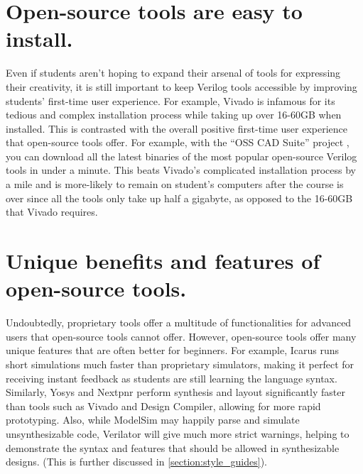 \section{Open-source tools are easy to install.}

Even if students aren't hoping to expand their arsenal of tools for expressing their creativity, it is still important to keep Verilog tools accessible by improving students' first-time user experience. For example, Vivado is infamous for its tedious and complex installation process while taking up over 16-60GB when installed. This is contrasted with the overall positive first-time user experience that open-source tools offer. For example, with the \enquote{OSS CAD Suite} project \cite{osscadsuitebuildGitHub}, you can download all the latest binaries of the most popular open-source Verilog tools in under a minute. This beats Vivado's complicated installation process by a mile and is more-likely to remain on student's computers after the course is over since all the tools only take up half a gigabyte, as opposed to the 16-60GB that Vivado requires.

\section{Unique benefits and features of open-source tools.}

Undoubtedly, proprietary tools offer a multitude of functionalities for advanced users that open-source tools cannot offer. However, open-source tools offer many unique features that are often better for beginners. For example, Icarus runs short simulations much faster than proprietary simulators, making it perfect for receiving instant feedback as students are still learning the language syntax. Similarly, Yosys and Nextpnr perform synthesis and layout significantly faster than tools such as Vivado and Design Compiler, allowing for more rapid prototyping. Also, while ModelSim may happily parse and simulate unsynthesizable code, Verilator will give much more strict warnings, helping to demonstrate the syntax and features that should be allowed in synthesizable designs. (This is further discussed in \autoref{section:style_guides}).

